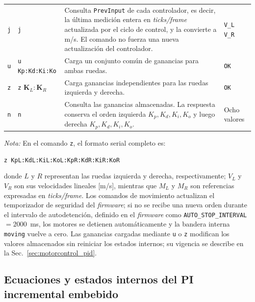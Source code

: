 \begin{appendices}
\begin{table}[H]
\begin{tabular}{c p{2.7cm} p{6.8cm} p{2.2cm}}
\texttt{j} &
\texttt{j} &
Consulta \texttt{PrevInput} de cada controlador, es decir, la última medición entera en \textit{ticks/frame} actualizada por el ciclo de control, y la convierte a m/s. El comando no fuerza una nueva actualización del controlador. &
\texttt{V\_L V\_R} \\

\texttt{u} &
\texttt{u Kp:Kd:Ki:Ko} &
Carga un conjunto común de ganancias para ambas ruedas. &
\texttt{OK} \\

\texttt{z} &
\texttt{z} $\mathbf{K}_L:\mathbf{K}_R$ &
Carga ganancias independientes para las ruedas izquierda y derecha. &
\texttt{OK} \\

\texttt{n} &
\texttt{n} &
Consulta las ganancias almacenadas. La respuesta conserva el orden izquierda $K_p,K_d,K_i,K_o$ y luego derecha $K_p,K_d,K_i,K_o$. &
Ocho valores \\

\bottomrule
\end{tabular}
\vspace{0.2cm}

\begin{minipage}{0.96\textwidth}
\footnotesize
\textit{Nota:} En el comando \texttt{z}, el formato serial completo es:

\begin{center}
\texttt{z KpL:KdL:KiL:KoL:KpR:KdR:KiR:KoR}
\end{center}
\end{minipage}
\end{table}

\noindent donde $L$ y $R$ representan las ruedas izquierda y derecha, respectivamente; $V_L$ y $V_R$ son sus velocidades lineales [m/s], mientras que $M_L$ y $M_R$ son referencias expresadas en \textit{ticks/frame}. Los comandos de movimiento actualizan el temporizador de seguridad del \textit{firmware}; si no se recibe una nueva orden durante el intervalo de autodetención, definido en el \textit{firmware} como \texttt{AUTO\_STOP\_INTERVAL}$=2000$~ms, los motores se detienen automáticamente y la bandera interna \texttt{moving} vuelve a cero. Las ganancias cargadas mediante \texttt{u} o \texttt{z} modifican los valores almacenados sin reiniciar los estados internos; su vigencia se describe en la Sec.~\ref{sec:motorcontrol_pid}.

\subsection{Ecuaciones y estados internos del PI incremental embebido}
\label{anx:pid_ecuaciones}


\end{appendices}
